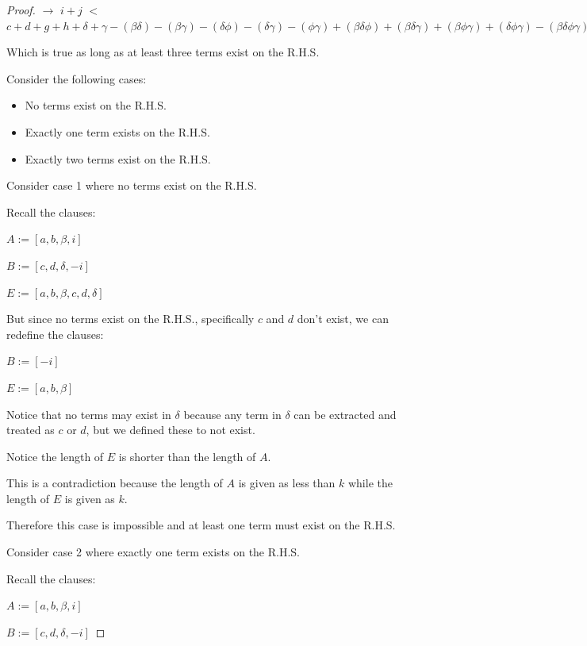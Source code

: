 \documentclass[manuscript]{acmart}
\begin{document}
\begin{proof}
        $\rightarrow$
        $i + j$
        $<$
        $c + d + g + h
            + \delta + \gamma
            - (\beta \delta) - (\beta \gamma) - (\delta \phi) - (\delta \gamma) -(\phi \gamma)
            + (\beta \delta \phi) + (\beta \delta \gamma) + (\beta \phi \gamma) + (\delta \phi \gamma)
            - (\beta \delta \phi \gamma)
        $

        Which is true as long as at least three terms exist on the R.H.S.

        Consider the following cases:

        \begin{itemize}
            \item No terms exist on the R.H.S.
            \item Exactly one term exists on the R.H.S.
            \item Exactly two terms exist on the R.H.S.
        \end{itemize}

        Consider case 1 where no terms exist on the R.H.S.

        Recall the clauses:

        $A := [a, b, \beta, i]$

        $B := [c, d, \delta, -i]$

        $E := [a, b, \beta, c, d, \delta]$

        But since no terms exist on the R.H.S., specifically $c$ and $d$ don't exist, we can redefine the clauses:

        $B := [-i]$

        $E := [a, b, \beta]$

        Notice that no terms may exist in $\delta$ because any term in $\delta$ can be extracted and treated as $c$ or $d$, but we defined these to not exist.

        Notice the length of $E$ is shorter than the length of $A$.

        This is a contradiction because the length of $A$ is given as less than $k$ while the length of $E$ is given as $k$.

        Therefore this case is impossible and at least one term must exist on the R.H.S.
 
        Consider case 2 where exactly one term exists on the R.H.S.

        Recall the clauses:

        $A := [a, b, \beta, i]$

        $B := [c, d, \delta, -i]$


\end{proof}
\end{document}
